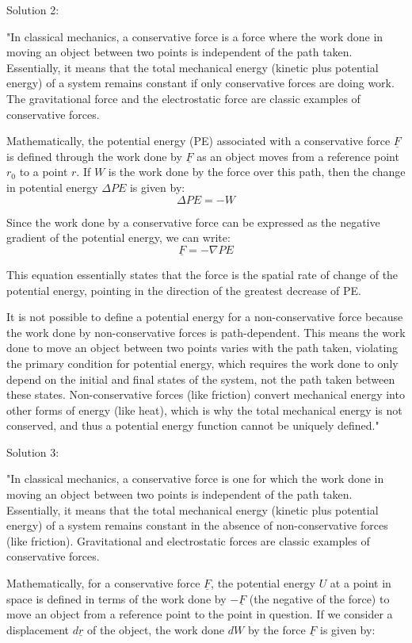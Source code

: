 Solution 2:

"In classical mechanics, a conservative force is a force where the work done in moving an object between two points is independent of the path taken. Essentially, it means that the total mechanical energy (kinetic plus potential energy) of a system remains constant if only conservative forces are doing work. The gravitational force and the electrostatic force are classic examples of conservative forces.

Mathematically, the potential energy (PE) associated with a conservative force \( \underline{F} \) is defined through the work done by \( \underline{F} \) as an object moves from a reference point \( r_0 \) to a point \( r \). If \( W \) is the work done by the force over this path, then the change in potential energy \( \Delta PE \) is given by:
\[ \Delta PE = -W \]

Since the work done by a conservative force can be expressed as the negative gradient of the potential energy, we can write:
\[ \underline{F} = -\nabla PE \]

This equation essentially states that the force is the spatial rate of change of the potential energy, pointing in the direction of the greatest decrease of PE.

It is not possible to define a potential energy for a non-conservative force because the work done by non-conservative forces is path-dependent. This means the work done to move an object between two points varies with the path taken, violating the primary condition for potential energy, which requires the work done to only depend on the initial and final states of the system, not the path taken between these states. Non-conservative forces (like friction) convert mechanical energy into other forms of energy (like heat), which is why the total mechanical energy is not conserved, and thus a potential energy function cannot be uniquely defined."

Solution 3:

"In classical mechanics, a conservative force is one for which the work done in moving an object between two points is independent of the path taken. Essentially, it means that the total mechanical energy (kinetic plus potential energy) of a system remains constant in the absence of non-conservative forces (like friction). Gravitational and electrostatic forces are classic examples of conservative forces.

Mathematically, for a conservative force \( \underline{F} \), the potential energy \( U \) at a point in space is defined in terms of the work done by \( -\underline{F} \) (the negative of the force) to move an object from a reference point to the point in question. If we consider a displacement \( d\underline{r} \) of the object, the work done \( dW \) by the force \( \underline{F} \) is given by:


